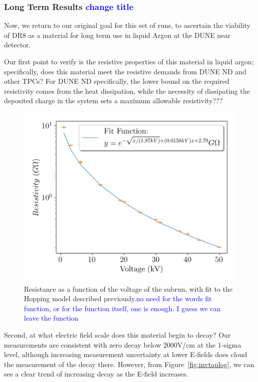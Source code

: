 \documentclass[a4paper,12pt]{article}
\newcommand{\RI}[1]{\textcolor{blue}{#1}}
\begin{document}
\subsubsection{Long Term Results \RI{change title}}
\label{sec:long_term_results}
Now, we return to our original goal for this set of runs, to ascertain the viability of DR8 as a material for long term use in liquid Argon at the DUNE near detector. 

Our first point to verify is the resistive properties of this material in liquid argon; specifically, does this material meet the resistive demands from DUNE ND and other TPCs? For DUNE ND specifically, the lower bound on the required resistivity comes from the heat dissipation, while the necessity of dissipating the deposited charge in the system sets a maximum allowable resistivity???

\begin{figure}
	\begin{center}
		
		\includegraphics[width=0.75\linewidth]{Efield_Z.png}
		\caption{Resistance as a function of the voltage of the subrun, with fit to the Hopping model described previously.\RI{no need for the words fit function, or for the function itself, one is enough. I guess we can leave the function}} 
		\label{fig:resvsvol}
	\end{center}
\end{figure}


Second, at what electric field scale does this material begin to decay? Our measurements are consistent with zero decay below 2000V/cm at the 1-sigma level, although increasing measurement uncertainty at lower E-fields does cloud the measurement of the decay there. However, from Figure~\ref{fig:invtaulog}, we can see a clear trend of increasing decay as the E-field increases.
\end{document}
